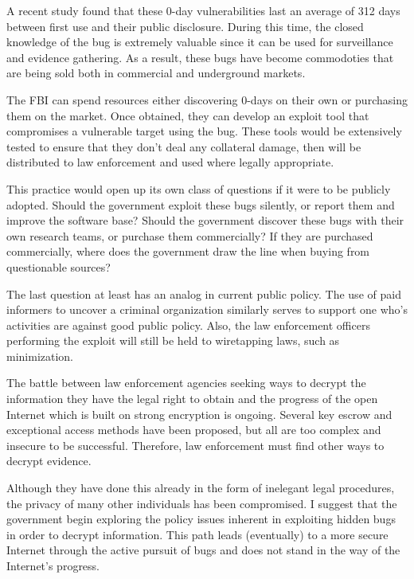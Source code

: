 \documentclass[12pt]{turabian-researchpaper}
\begin{document}
A recent study found that these 0-day vulnerabilities last an average of 312 days between first use and their public disclosure.
During this time, the closed knowledge of the bug is extremely valuable since it can be used for surveillance and evidence gathering.
As a result, these bugs have become commodoties that are being sold both in commercial and underground markets.

The FBI can spend resources either discovering 0-days on their own or purchasing them on the market.
Once obtained, they can develop an exploit tool that compromises a vulnerable target using the bug.
These tools would be extensively tested to ensure that they don't deal any collateral damage, then will be distributed to law enforcement and used where legally appropriate.

This practice would open up its own class of questions if it were to be publicly adopted.
Should the government exploit these bugs silently, or report them and improve the software base?
Should the government discover these bugs with their own research teams, or purchase them commercially?
If they are purchased commercially, where does the government draw the line when buying from questionable sources?

The last question at least has an analog in current public policy.
The use of paid informers to uncover a criminal organization similarly serves to support one who's activities are against good public policy.
Also, the law enforcement officers performing the exploit will still be held to wiretapping laws, such as minimization.

The battle between law enforcement agencies seeking ways to decrypt the information they have the legal right to obtain and the progress of the open Internet which is built on strong encryption is ongoing.
Several key escrow and exceptional access methods have been proposed, but all are too complex and insecure to be successful.
Therefore, law enforcement must find other ways to decrypt evidence.

Although they have done this already in the form of inelegant legal procedures, the privacy of many other individuals has been compromised.
I suggest that the government begin exploring the policy issues inherent in exploiting hidden bugs in order to decrypt information.
This path leads (eventually) to a more secure Internet through the active pursuit of bugs and does not stand in the way of the Internet's progress.

\pagebreak
\theendnotes
\pagebreak
\printbibliography
\end{document}

